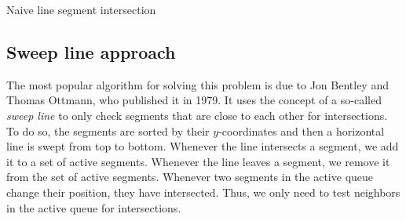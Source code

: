         \begin{breakablealgorithm}
            \caption{Naive line segment intersection}
            \label{alg:line_intersection_naive}
            \begin{algorithmic}[1]
                     
                         
                             
                    \EndFor\EndFor
                    \State{} 
                \EndProcedure
            \end{algorithmic}
        \end{breakablealgorithm} 

    \subsection{Sweep line approach}
        The most popular algorithm for solving this problem is due to Jon Bentley and Thomas Ottmann, who published it in 1979. It uses the concept of a so-called \emph{sweep line} to only check segments that are close to each other for intersections. To do so, the segments are sorted by their $y$-coordinates and then a horizontal line is swept from top to bottom. Whenever the line intersects a segment, we add it to a set of active segments. Whenever the line leaves a segment, we remove it from the set of active segments. Whenever two segments in the active queue change their position, they have intersected. Thus, we only need to test neighbors in the active queue for intersections.

